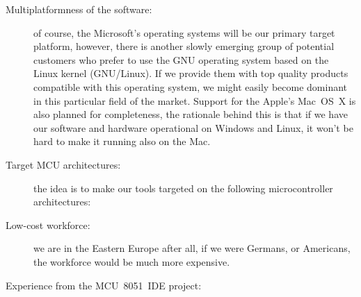 \documentclass[a4paper,twoside,15pt]{book}
\begin{document}
\begin{description}
                \item[Multiplatformness of the software:]
                    of course, the Microsoft's operating systems will be our primary target platform, however, there is another slowly emerging group of potential customers who prefer to use the GNU operating system based on the Linux kernel (GNU/Linux). If we provide them with top quality products compatible with this operating system, we might easily become dominant in this particular field of the market. Support for the Apple's Mac~OS~X is also planned for completeness, the rationale behind this is that if we have our software and hardware operational on Windows\textregistered{} and Linux\textregistered{}, it won't be hard to make it running also on the Mac.
                \item[Target MCU architectures:]
                    the idea is to make our tools targeted on the following microcontroller architectures:
                \item[Low-cost workforce:]
                    we are in the Eastern Europe after all, if we were Germans, or Americans, the workforce would be much more expensive.
                \item[Experience from the MCU~8051~IDE project:]

\end{description}
\end{document}
